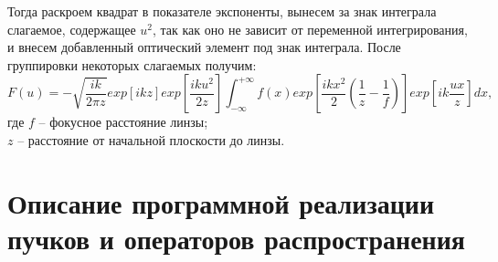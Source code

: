 {	Тогда раскроем квадрат в показателе экспоненты, вынесем за знак интеграла слагаемое, содержащее $u^2$, так как оно не зависит от переменной интегрирования, и внесем добавленный оптический элемент под знак интеграла. После группировки некоторых слагаемых получим:
	\begin{equation*}
	F(u) = - \sqrt{\frac{ik}{2 \pi z}}exp[ikz] exp[{ \frac{iku^2}{2z} }] \int_{-\infty}^{+\infty}f(x) exp[\frac{ikx^2}{2}( \frac{1}{z} - \frac{1}{f})] exp[{ik \frac{ux}{z}}]dx,
	\end{equation*}
\tab	где $f$ -- фокусное расстояние линзы;\\
	\tab \tab \hspace{-0.4cm}$z$ -- расстояние от начальной плоскости до  линзы.
}
\newpage

\section[Описание программной реализации пучков и операторов распространения]{\nohyphens{Описание программной реализации пучков и операторов распространения}}
